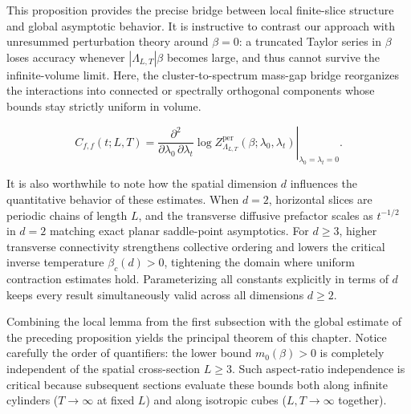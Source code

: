 \documentclass[11pt]{article}
\theoremstyle{definition}
\begin{document}
This proposition provides the precise bridge between local finite-slice structure
and global asymptotic behavior. It is instructive to contrast our approach with
unresummed perturbation theory around $\beta = 0$: a truncated Taylor series in
$\beta$ loses accuracy whenever $|\Lambda_{L,T}| \beta$ becomes large, and thus
cannot survive the infinite-volume limit. Here, the cluster-to-spectrum mass-gap
bridge reorganizes the interactions into connected or spectrally orthogonal
components whose bounds stay strictly uniform in volume.

\[
  C_{f,f}(t; L, T) = \left. \frac{\partial^2}{\partial \lambda_0 \, \partial \lambda_t} \log Z_{\Lambda_{L,T}}^{\mathrm{per}}(\beta; \lambda_0, \lambda_t) \right|_{\lambda_0 = \lambda_t = 0}.
\]

It is also worthwhile to note how the spatial dimension $d$ influences the
quantitative behavior of these estimates. When $d = 2$, horizontal slices are
periodic chains of length $L$, and the transverse diffusive prefactor scales as
$t^{-1/2}$ in $d = 2$ matching exact planar saddle-point asymptotics. For $d \ge 3$,
higher transverse connectivity strengthens collective ordering and lowers the
critical inverse temperature $\beta_c(d) > 0$, tightening the domain where uniform
contraction estimates hold. Parameterizing all constants explicitly in terms of $d$
keeps every result simultaneously valid across all dimensions $d \ge 2$.

Combining the local lemma from the first subsection with the global estimate of the
preceding proposition yields the principal theorem of this chapter. Notice carefully
the order of quantifiers: the lower bound $m_0(\beta) > 0$ is completely independent
of the spatial cross-section $L \ge 3$. Such aspect-ratio independence is critical
because subsequent sections evaluate these bounds both along infinite cylinders ($T
\to \infty$ at fixed $L$) and along isotropic cubes ($L, T \to \infty$ together).
\end{document}
